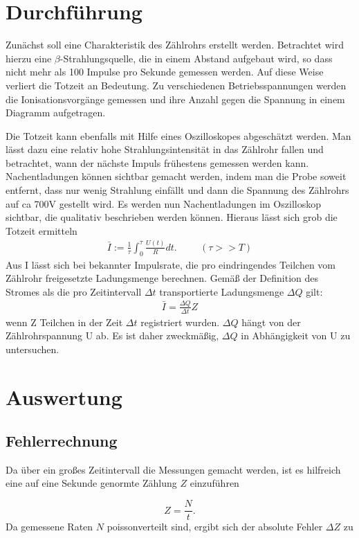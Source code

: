 \section{Durchführung}
Zunächst soll eine Charakteristik des Zählrohrs erstellt werden. Betrachtet wird hierzu eine $\beta$-Strahlungsquelle, die in einem
Abstand aufgebaut wird, so dass nicht mehr als 100 Impulse pro Sekunde gemessen werden. Auf diese Weise verliert die Totzeit an Bedeutung.
Zu verschiedenen Betriebsspannungen werden die Ionisationsvorgänge gemessen und ihre Anzahl gegen die Spannung in einem Diagramm
aufgetragen.

Die Totzeit kann ebenfalls mit Hilfe eines Oszilloskopes abgeschätzt werden. Man lässt dazu eine relativ hohe Strahlungsintensität in das Zählrohr fallen und betrachtet, wann der nächste Impuls frühestens gemessen werden kann.
Nachentladungen können sichtbar gemacht werden, indem man die Probe soweit entfernt, dass nur wenig Strahlung einfällt und dann die
Spannung des Zählrohrs auf ca 700V gestellt wird. Es werden nun Nachentladungen im Oszilloskop sichtbar, die qualitativ beschrieben
werden können. Hieraus lässt sich grob die Totzeit ermitteln
\begin{align}
\bar{I}:= \frac{1}{\tau} \int_0^\tau \frac{U(t)}{R}dt. \hspace{1cm} (\tau >> T)
\end{align}
Aus I lässt sich bei bekannter Impulsrate, die pro eindringendes Teilchen vom Zählrohr freigesetzte Ladungsmenge berechnen. Gemäß der Definition des Stromes als die pro Zeitintervall $\Delta t$ transportierte Ladungsmenge $\Delta Q$ gilt:
\begin{align}
\bar{I} = \frac{\Delta Q}{\Delta t} Z
\label{eq_ladung}
\end{align}
wenn Z Teilchen in der Zeit $\Delta t$ registriert wurden.
$\Delta Q$ hängt von der Zählrohrspannung U ab. Es ist daher zweckmäßig, $\Delta Q$ in Abhängigkeit von U zu untersuchen.


\section{Auswertung}
\subsection{Fehlerrechnung}
Da über ein großes Zeitintervall die Messungen gemacht werden, ist es hilfreich eine auf eine Sekunde genormte Zählung $Z$ einzuführen

\begin{equation}
 Z = \frac{N}{t}.
\end{equation}
Da gemessene Raten $N$ poissonverteilt sind, ergibt sich der absolute Fehler $\Delta Z$ zu

